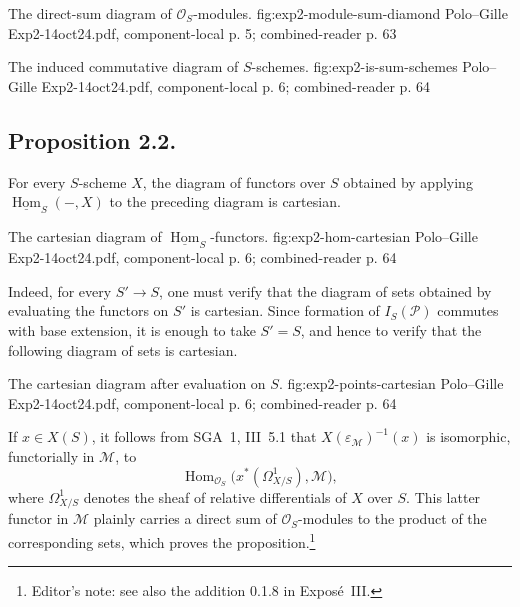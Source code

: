   {The direct-sum diagram of \(\mathcal O_S\)-modules.}
  {fig:exp2-module-sum-diamond}
  {Polo--Gille Exp2-14oct24.pdf, component-local p. 5; combined-reader p. 63}

  {The induced commutative diagram of \(S\)-schemes.}
  {fig:exp2-is-sum-schemes}
  {Polo--Gille Exp2-14oct24.pdf, component-local p. 6; combined-reader p. 64}

\subsection*{Proposition 2.2.}
For every \(S\)-scheme \(X\), the diagram of functors over \(S\) obtained
by applying \(\underline{\operatorname{Hom}}_S(-,X)\) to the preceding
diagram is cartesian.

  {The cartesian diagram of \(\underline{\operatorname{Hom}}_S\)-functors.}
  {fig:exp2-hom-cartesian}
  {Polo--Gille Exp2-14oct24.pdf, component-local p. 6; combined-reader p. 64}

Indeed, for every \(S'\to S\), one must verify that the diagram of sets
obtained by evaluating the functors on \(S'\) is cartesian. Since formation
of \(I_S(\mathcal P)\) commutes with base extension, it is enough to take
\(S'=S\), and hence to verify that the following diagram of sets is
cartesian.

  {The cartesian diagram after evaluation on \(S\).}
  {fig:exp2-points-cartesian}
  {Polo--Gille Exp2-14oct24.pdf, component-local p. 6; combined-reader p. 64}

If \(x\in X(S)\), it follows from SGA~1, III~5.1 that
\(X(\varepsilon_{\mathcal M})^{-1}(x)\) is isomorphic, functorially in
\(\mathcal M\), to
\[
  \operatorname{Hom}_{\mathcal O_S}
    \bigl(x^*(\Omega^1_{X/S}),\mathcal M\bigr),
\]
where \(\Omega^1_{X/S}\) denotes the sheaf of relative differentials of
\(X\) over \(S\). This latter functor in \(\mathcal M\) plainly carries a
direct sum of \(\mathcal O_S\)-modules to the product of the corresponding
sets, which proves the proposition.\footnote{Editor's note: see also the
addition 0.1.8 in Expos\'e~III.}

